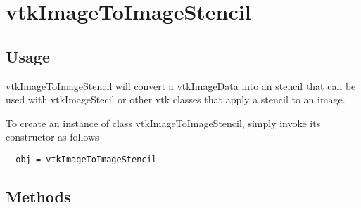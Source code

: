 \section{vtkImageToImageStencil}

\subsection{Usage}

 vtkImageToImageStencil will convert a vtkImageData into an stencil
 that can be used with vtkImageStecil or other vtk classes that apply
 a stencil to an image.

To create an instance of class vtkImageToImageStencil, simply
invoke its constructor as follows
\begin{verbatim}
  obj = vtkImageToImageStencil
\end{verbatim}
\subsection{Methods}

